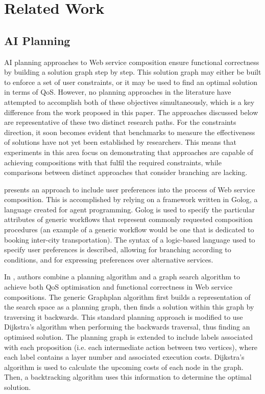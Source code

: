 \documentclass[conference]{IEEEtran}
\begin{document}
\section{Related Work}\label{related}

\subsection{AI Planning}
AI planning approaches to Web service composition ensure functional correctness by building a solution graph step by step. This solution graph may either be built to
enforce a set of user constraints, or it may be used to find an optimal solution in terms of QoS. However, no planning approaches in the literature have attempted to accomplish
both of these objectives simultaneously, which is a key difference from the work proposed in this paper. The approaches discussed below are representative of these two distinct research paths. For the constraints direction, it soon becomes evident that benchmarks to measure the effectiveness of solutions have not yet been established by researchers. This means that experiments in this area focus on demonstrating that approaches are capable of achieving compositions with that fulfil the required constraints, while comparisons between distinct approaches that consider branching are lacking. 

\cite{sohrabi2009web} presents an approach to include user preferences into the process of Web service composition. This is
accomplished by relying on a framework written in Golog, a language created for agent programming. Golog is used
to specify the particular attributes of generic workflows that represent commonly requested composition procedures
(an example of a generic workflow would be one that is dedicated to booking inter-city transportation).
The syntax of a logic-based language used to specify user preferences is described, allowing for
branching according to conditions, and for expressing preferences over alternative services.

In \cite{chen2014qos}, authors combine a planning algorithm and a graph search algorithm to achieve both QoS optimisation and functional correctness in Web service compositions. The
generic Graphplan algorithm first builds a representation of the search space as a planning graph, then finds a solution within this graph by traversing it backwards. This
standard planning approach is modified to use Dijkstra's algorithm when performing the backwards traversal, thus finding an optimised solution. The planning graph
is extended to include labels associated with each proposition (i.e. each intermediate action between two vertices), where each label contains a layer number and
associated execution costs. Dijkstra's algorithm is used to calculate the upcoming costs of each node in the graph. Then, a backtracking algorithm uses this
information to determine the optimal solution.
\end{document}
